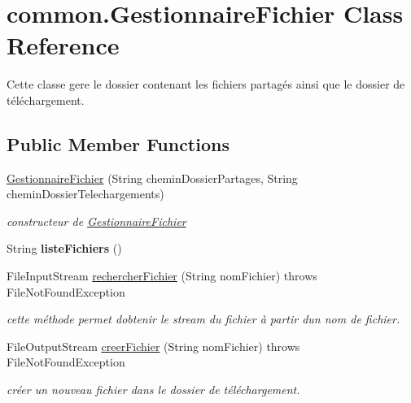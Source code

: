 \hypertarget{classcommon_1_1GestionnaireFichier}{}\section{common.\+Gestionnaire\+Fichier Class Reference}
\label{classcommon_1_1GestionnaireFichier}


Cette classe gere le dossier contenant les fichiers partagés ainsi que le dossier de téléchargement.  


\subsection*{Public Member Functions}
\begin{DoxyCompactItemize}
\item 
\hyperlink{classcommon_1_1GestionnaireFichier_af063deb28fa952a2d0c605bc26659b16}{Gestionnaire\+Fichier} (String chemin\+Dossier\+Partages, String chemin\+Dossier\+Telechargements)
\begin{DoxyCompactList}\small\item\em constructeur de \hyperlink{classcommon_1_1GestionnaireFichier}{Gestionnaire\+Fichier} \end{DoxyCompactList}\item 
\mbox{\label{classcommon_1_1GestionnaireFichier_a7189336732591523f7490df6a16cae34}} 
String {\bfseries liste\+Fichiers} ()
\item 
File\+Input\+Stream \hyperlink{classcommon_1_1GestionnaireFichier_a55da4571d743ce9ee31a96bd04de9aa4}{rechercher\+Fichier} (String nom\+Fichier)  throws File\+Not\+Found\+Exception 
\begin{DoxyCompactList}\small\item\em cette méthode permet d\textquotesingle{}obtenir le stream du fichier à partir d\textquotesingle{}un nom de fichier. \end{DoxyCompactList}\item 
File\+Output\+Stream \hyperlink{classcommon_1_1GestionnaireFichier_a7aa94ceed1766208e16cd4d3ce8465b7}{creer\+Fichier} (String nom\+Fichier)  throws File\+Not\+Found\+Exception 
\begin{DoxyCompactList}\small\item\em créer un nouveau fichier dans le dossier de téléchargement. \end{DoxyCompactList}\end{DoxyCompactItemize}



